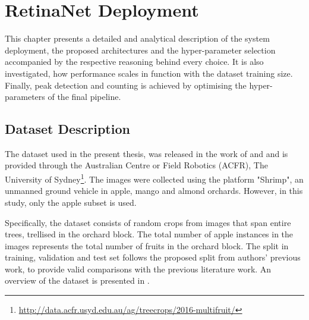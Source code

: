 \chapter{RetinaNet Deployment} \label{Chapter:Experiment}
This chapter presents a detailed and analytical description of the system deployment, the proposed architectures and the hyper-parameter selection accompanied by the respective reasoning behind every choice. It is also investigated, how performance scales in function with the dataset training size. Finally, peak detection and counting is achieved by optimising the hyper-parameters of the final pipeline.

\section{Dataset Description}
The dataset used in the present thesis, was released in the work of \cite{bargoti2017image} and \cite{bargoti2017deep} and is provided through the Australian Centre or Field Robotics (ACFR), The University of Sydney\footnote{\url{http://data.acfr.usyd.edu.au/ag/treecrops/2016-multifruit/}}. The images were collected using the platform "Shrimp", an unmanned ground vehicle in apple, mango and almond orchards. However, in this study, only the apple subset is used.

Specifically, the dataset consists of random crops from images that span entire trees, trellised in the orchard block. The total number of apple instances in the images represents the total number of fruits in the orchard block. The split in training, validation and test set follows the proposed split from authors' previous work, to provide valid comparisons with the previous literature work. An overview of the dataset is presented in .

\begin{table}[!htb]
  \centering
  \caption{ACFR dataset description}
  \label{tab1}
\end{table}

